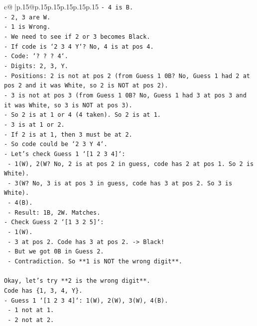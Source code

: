 \documentclass{article}
\begin{document}
{\begin{supertabular}{c@{$\;$}|p{.15\linewidth}@{}p{.15\linewidth}p{.15\linewidth}p{.15\linewidth}p{.15\linewidth}p{.15\linewidth}}
{{{\texttt{{-} 4 is B.} \\
\texttt{{-} 2, 3 are W.} \\
\texttt{{-} 1 is Wrong.} \\
\texttt{{-} We need to see if 2 or 3 becomes Black.} \\
\texttt{{-} If code is `2 3 4 Y`? No, 4 is at pos 4.} \\
\texttt{{-} Code: `? ? ? 4`.} \\
\texttt{{-} Digits: 2, 3, Y.} \\
\texttt{{-} Positions: 2 is not at pos 2 (from Guess 1 0B? No, Guess 1 had 2 at pos 2 and it was White, so 2 is NOT at pos 2).} \\
\texttt{{-} 3 is not at pos 3 (from Guess 1 0B? No, Guess 1 had 3 at pos 3 and it was White, so 3 is NOT at pos 3).} \\
\texttt{{-} So 2 is at 1 or 4 (4 taken). So 2 is at 1.} \\
\texttt{{-} 3 is at 1 or 2.} \\
\texttt{{-} If 2 is at 1, then 3 must be at 2.} \\
\texttt{{-} So code could be `2 3 Y 4`.} \\
\texttt{{-} Let's check Guess 1 `{[}1 2 3 4{]}`:} \\
\texttt{  {-} 1(W), 2(W? No, 2 is at pos 2 in guess, code has 2 at pos 1. So 2 is White).} \\
\texttt{  {-} 3(W? No, 3 is at pos 3 in guess, code has 3 at pos 2. So 3 is White).} \\
\texttt{  {-} 4(B).} \\
\texttt{  {-} Result: 1B, 2W. Matches.} \\
\texttt{{-} Check Guess 2 `{[}1 3 2 5{]}`:} \\
\texttt{  {-} 1(W).} \\
\texttt{  {-} 3 at pos 2. Code has 3 at pos 2. {-}> Black!} \\
\texttt{  {-} But we got 0B in Guess 2.} \\
\texttt{  {-} Contradiction. So **1 is NOT the wrong digit**.} \\
\\ 
\texttt{Okay, let's try **2 is the wrong digit**.} \\
\texttt{Code has \{1, 3, 4, Y\}.} \\
\texttt{{-} Guess 1 `{[}1 2 3 4{]}`: 1(W), 2(W), 3(W), 4(B).} \\
\texttt{  {-} 1 not at 1.} \\
\texttt{  {-} 2 not at 2.} \\
}}}
\end{supertabular}}
\end{document}

